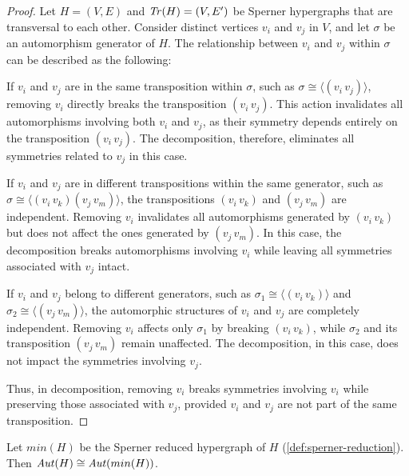 \begin{proof}
Let $H=(V,E)$ and $\mathit{Tr}(H)=(V,E')$ be Sperner hypergraphs that are transversal to each other. Consider distinct vertices $v_i$ and $v_j$ in $V$, and let $\sigma$ be an automorphism generator of $H$. The relationship between $v_i$ and $v_j$ within $\sigma$ can be described as the following:

If $v_i$ and $v_j$ are in the same transposition within $\sigma$, such as $\sigma\cong\langle(v_i\,v_j)\rangle$, removing $v_i$ directly breaks the transposition $(v_i\,v_j)$. This action invalidates all automorphisms involving both $v_i$ and $v_j$, as their symmetry depends entirely on the transposition $(v_i\,v_j)$. The decomposition, therefore, eliminates all symmetries related to $v_j$ in this case.

If $v_i$ and $v_j$ are in different transpositions within the same generator, such as $\sigma\cong\langle(v_i\,v_k)(v_j\,v_m)\rangle$, the transpositions $(v_i\,v_k)$ and $(v_j\,v_m)$ are independent. Removing $v_i$ invalidates all automorphisms generated by $(v_i\,v_k)$ but does not affect the ones generated by $(v_j\,v_m)$. In this case, the decomposition breaks automorphisms involving $v_i$ while leaving all symmetries associated with $v_j$ intact.

If $v_i$ and $v_j$ belong to different generators, such as $\sigma_1\cong\langle(v_i\,v_k)\rangle$ and $\sigma_2\cong\langle(v_j\,v_m)\rangle$, the automorphic structures of $v_i$ and $v_j$ are completely independent. Removing $v_i$ affects only $\sigma_1$ by breaking $(v_i\,v_k)$, while $\sigma_2$ and its transposition $(v_j\,v_m)$ remain unaffected. The decomposition, in this case, does not impact the symmetries involving $v_j$.

Thus, in \FKA{} decomposition, removing $v_i$ breaks symmetries involving $v_i$ while preserving those associated with $v_j$, provided $v_i$ and $v_j$ are not part of the same transposition.
\end{proof}

\begin{corollary}\label{cor:aut-min}
Let $min(H)$ be the Sperner reduced hypergraph of $H$ (\ref{def:sperner-reduction}). Then $\mathit{Aut}(H)\cong\mathit{Aut}(min(H))$.
\end{corollary}


